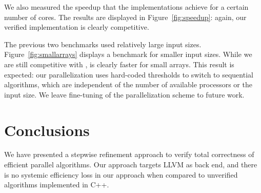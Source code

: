 \documentclass[sn-mathphys,Numbered]{sn-jnl}
\theoremstyle{thmstyleone}%
\theoremstyle{definition}%
\theoremstyle{thmstylethree}%
\begin{document}
  We also measured the speedup that the implementations achieve for a certain number of cores.
  The results are displayed in Figure~\ref{fig:speedup}: again, our verified implementation is clearly competitive.

  The previous two benchmarks used relatively large input sizes.
  Figure~\ref{fig:smallarrays} displays a benchmark for smaller input sizes. While we are still competitive with ,
   is clearly faster for small arrays. This result is expected: our parallelization uses hard-coded thresholds
  to switch to sequential algorithms, which are independent of the number of available processors or the input size.
  We leave fine-tuning of the parallelization scheme to future work.


%
%
%




  \section{Conclusions}\label{sec:concl}
    We have presented a stepwise refinement approach to verify total correctness of efficient parallel algorithms.
    Our approach targets LLVM as back end, and there is no systemic efficiency loss in our approach
    when compared to unverified algorithms implemented in C++.
\end{document}
